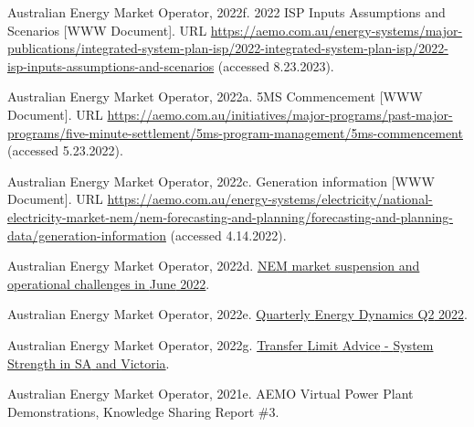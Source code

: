 \documentclass[12pt,a4paper,]{report}
\newlength{\cslhangindent}
\newenvironment{CSLReferences}[2] %
 {%
  \setlength{\parindent}{0pt}
  \ifodd #1 \everypar{\setlength{\hangindent}{\cslhangindent}}\ignorespaces\fi
  \ifnum #2 > 0
  \setlength{\parskip}{#2\baselineskip}
  \fi
 }%
 {}
\begin{document}
\begin{CSLReferences}{1}{0}
\leavevmode{}%
Australian Energy Market Operator, 2022f. 2022 {ISP Inputs Assumptions}
and {Scenarios} {[}WWW Document{]}. URL
\url{https://aemo.com.au/energy-systems/major-publications/integrated-system-plan-isp/2022-integrated-system-plan-isp/2022-isp-inputs-assumptions-and-scenarios}
(accessed 8.23.2023).

\leavevmode{}%
Australian Energy Market Operator, 2022a. {5MS Commencement} {[}WWW
Document{]}. URL
\url{https://aemo.com.au/initiatives/major-programs/past-major-programs/five-minute-settlement/5ms-program-management/5ms-commencement}
(accessed 5.23.2022).

\leavevmode{}%
Australian Energy Market Operator, 2022c. Generation information {[}WWW
Document{]}. URL
\url{https://aemo.com.au/energy-systems/electricity/national-electricity-market-nem/nem-forecasting-and-planning/forecasting-and-planning-data/generation-information}
(accessed 4.14.2022).

\leavevmode{}%
Australian Energy Market Operator, 2022d.
\href{https://aemo.com.au/-/media/files/electricity/nem/market_notices_and_events/market_event_reports/2022/nem-market-suspension-and-operational-challenges-in-june-2022.pdf?la=en}{{NEM}
market suspension and operational challenges in {June} 2022}.

\leavevmode{}%
Australian Energy Market Operator, 2022e.
\href{https://www.aemo.com.au/-/media/files/major-publications/qed/2022/qed-q2-2022.pdf?la=en}{Quarterly
{Energy Dynamics Q2} 2022}.

\leavevmode{}%
Australian Energy Market Operator, 2022g.
\href{https://www.aemo.com.au/-/media/files/electricity/nem/security_and_reliability/congestion-information/transfer-limit-advice-system-strength.pdf?la=en}{Transfer
{Limit Advice} - {System Strength} in {SA} and {Victoria}}.

\leavevmode{}%
Australian Energy Market Operator, 2021e. {AEMO Virtual Power Plant
Demonstrations}, {Knowledge Sharing Report} \#3.


\end{CSLReferences}
\end{document}
